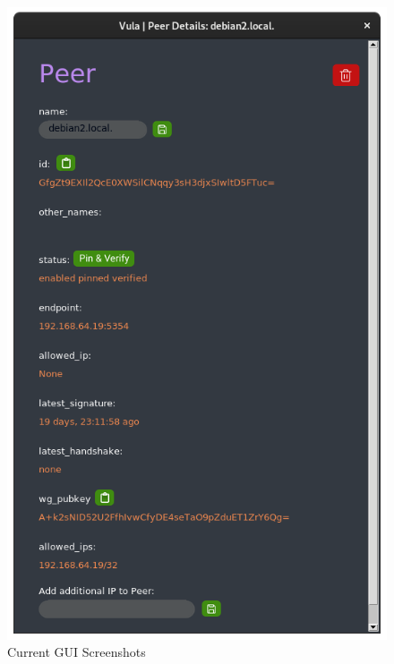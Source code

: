 \documentclass[
    type=projectproposal,
    twocolumn
]{bfhpub}
\begin{document}
\begin{figure}[ht]
\begin{minipage}{0.49\linewidth}
        \includegraphics[width=\linewidth]{./../misc/frontend/peer.png}
    \end{minipage}
    \caption{Current GUI Screenshots}
\end{figure}

\par\nointerlineskip\bfhRule
\end{document}
